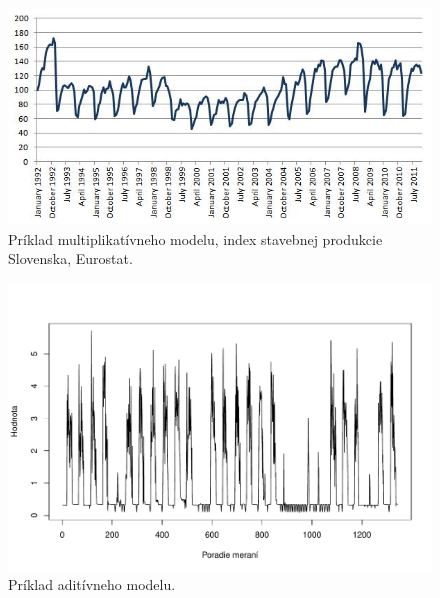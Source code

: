 \documentclass[a4paper,twoside,slovak,12pt,appendix]{article}
\begin{document}
\begin{figure}[H]
  \centering
	\captionsetup{justification=centering}
  \includegraphics[width=\textwidth]{multi_model.jpg}
  \caption[Príklad multiplikatívneho modelu.]{Príklad multiplikatívneho modelu, index stavebnej produkcie Slovenska, Eurostat.}
  \label{fig:multi-time-series-model}
\end{figure}

\begin{figure}[H]
  \centering
  \includegraphics[width=\textwidth]{add_model.pdf}
  \caption{Príklad aditívneho modelu.}
  \label{fig:add-time-series-model}
\end{figure}


\end{document}
